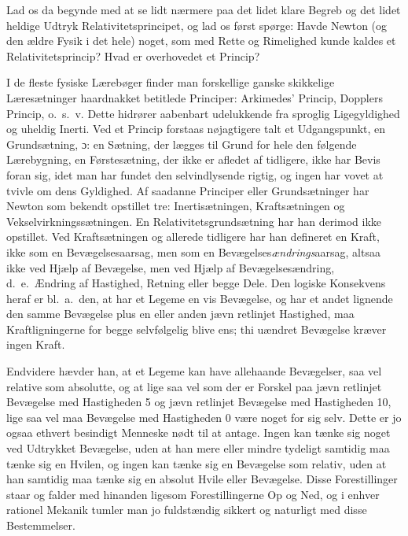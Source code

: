 \documentclass[12pt,a4paper]{article}
\newcommand{\opage}[1]{\marginnote{\footnotesize\textit{[#1]}}}
\begin{document}
\opage{195} Lad os da begynde med at se lidt nærmere paa det lidet klare Begreb og det
lidet heldige Udtryk \guillemotleft Relativitetsprincipet\guillemotright, og
lad os først spørge: Havde Newton (og den ældre Fysik i det hele) noget, som
med Rette og Rimelighed kunde kaldes et Relativitetsprincip? Hvad er
overhovedet et Princip?

I de fleste fysiske Lærebøger finder man forskellige ganske skikkelige
Læresætninger haardnakket betitlede Principer: \guillemotleft Arkimedes'
Princip\guillemotright, \guillemotleft Dopplers Princip\guillemotright,
o.\ s.\ v. Dette hidrører aabenbart udelukkende fra sproglig Ligegyldighed og
uheldig Inerti. Ved et Princip forstaas nøjagtigere talt et Udgangspunkt, en
Grundsætning, ɔ: en Sætning, der lægges til Grund for hele den følgende
Lærebygning, en Førstesætning, der ikke er afledet af tidligere, ikke har Bevis
foran sig, idet man har fundet den selvindlysende rigtig, og ingen har vovet at
tvivle om dens Gyldighed. Af saadanne Principer eller Grundsætninger har Newton
som bekendt opstillet tre: Inertisætningen, Kraftsætningen og
Vekselvirkningssætningen. En \guillemotleft
Relativitetsgrundsætning\guillemotright{} har han derimod ikke opstillet. Ved
Kraftsætningen og allerede tidligere har han defineret en Kraft, ikke som en
Bevægelsesaarsag, men som en Bevægelses\emph{ændrings}aarsag, altsaa ikke ved
Hjælp af Bevægelse, men ved Hjælp af Bevægelsesændring, d.\ e.\ Ændring af
Hastighed, Retning eller begge Dele. Den logiske Konsekvens heraf er
bl.\ a.\ den, at har et Legeme en vis Bevægelse, og har et andet lignende den
samme Bevægelse plus en eller anden jævn retlinjet Hastighed, maa
Kraftligningerne for begge selvfølgelig blive ens; thi uændret Bevægelse kræver
ingen Kraft.

Endvidere hævder han, at et Legeme kan have allehaande Bevægelser, saa vel
relative som absolutte, og at lige saa vel som der er Forskel paa jævn
retlinjet Bevægelse med Hastigheden 5 og jævn retlinjet Bevægelse med
Hastigheden 10, lige saa vel maa \guillemotleft Bevægelse med Hastigheden
0\guillemotright{} være noget for sig selv. Dette er jo ogsaa ethvert besindigt
Menneske nødt til at antage. Ingen kan tænke sig noget ved Udtrykket Bevægelse,
uden at han mere eller mindre tydeligt samtidig maa tænke sig en Hvilen, og
ingen kan tænke sig en Bevægelse som relativ, uden at han samtidig maa tænke
sig en absolut Hvile eller Bevægelse. Disse Forestillinger staar og falder med
hinanden ligesom Forestillingerne Op og Ned, og i enhver rationel Mekanik
tumler man jo fuldstændig sikkert og naturligt med disse Bestemmelser.
\end{document}
